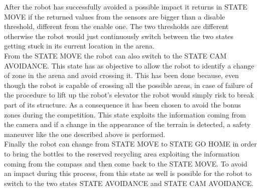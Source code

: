 After the robot has successfully avoided a possible impact it returns in STATE MOVE if the returned values from the sensors are bigger than a disable threshold, different from the enable one. The two thresholds are different otherwise the robot would just continuously switch between the two states getting stuck in its current location in the arena.\\

From the STATE MOVE the robot can also switch to the STATE CAM AVOIDANCE.
This state has as objective to allow the robot to identify a change of zone in the arena and avoid crossing it. This has been done because, even though the robot is capable of crossing all the possible areas, in case of failure of the procedure to lift up the robot's elevator the robot would simply risk to break part of its structure. As a consequence it has been chosen to avoid the bonus zones during the competition. This state exploits the information coming from the camera and if a change in the appearance of the terrain is detected, a safety maneuver like the one described above is performed.\\

Finally the robot can change from STATE MOVE to STATE GO HOME in order to bring the bottles to the reserved recycling area exploiting the information coming from the compass and then come back to the STATE MOVE. To avoid an impact during this process, from this state as well is possible for the robot to switch to the two states STATE AVOIDANCE and STATE CAM AVOIDANCE.




